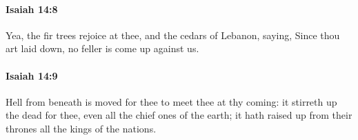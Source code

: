		\paragraph{Isaiah 14:8} %
			\label{ISAIAH-14-8}

			Yea, the fir trees rejoice at thee, and the cedars of Lebanon, saying, Since thou art laid down, no feller is come up against us.


		\paragraph{Isaiah 14:9} %
			\label{ISAIAH-14-9}

			Hell from beneath is moved for thee to meet thee at thy coming: it stirreth up the dead for thee, even all the chief ones of the earth; it hath raised up from their thrones all the kings of the nations.



